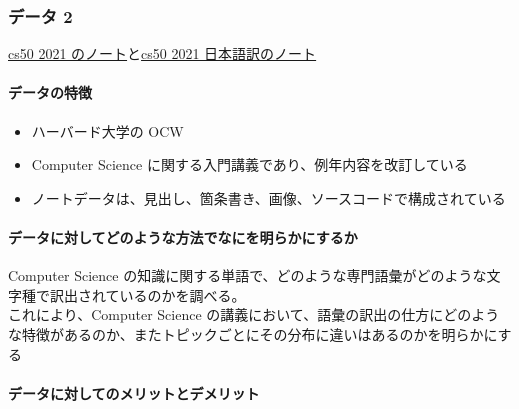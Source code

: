 \hypertarget{ux30c7ux30fcux30bf-2-1}{%
\subsubsection{データ 2}\label{ux30c7ux30fcux30bf-2-1}}

\href{https://cs50.harvard.edu/x/2021/notes/0/}{cs50 2021
のノート}と\href{https://cs50.jp/x/2021/week0/}{cs50 2021
日本語訳のノート}

\hypertarget{ux30c7ux30fcux30bfux306eux7279ux5fb4-4}{%
\paragraph{データの特徴}\label{ux30c7ux30fcux30bfux306eux7279ux5fb4-4}}

\begin{itemize}
\tightlist
\item
  ハーバード大学の OCW
\item
  Computer Science に関する入門講義であり、例年内容を改訂している
\item
  ノートデータは、見出し、箇条書き、画像、ソースコードで構成されている
\end{itemize}

\hypertarget{ux30c7ux30fcux30bfux306bux5bfeux3057ux3066ux3069ux306eux3088ux3046ux306aux65b9ux6cd5ux3067ux306aux306bux3092ux660eux3089ux304bux306bux3059ux308bux304b-4}{%
\paragraph{データに対してどのような方法でなにを明らかにするか}\label{ux30c7ux30fcux30bfux306bux5bfeux3057ux3066ux3069ux306eux3088ux3046ux306aux65b9ux6cd5ux3067ux306aux306bux3092ux660eux3089ux304bux306bux3059ux308bux304b-4}}

Computer Science
の知識に関する単語で、どのような専門語彙がどのような文字種で訳出されているのかを調べる。\\
これにより、Computer Science
の講義において、語彙の訳出の仕方にどのような特徴があるのか、またトピックごとにその分布に違いはあるのかを明らかにする

\hypertarget{ux30c7ux30fcux30bfux306bux5bfeux3057ux3066ux306eux30e1ux30eaux30c3ux30c8ux3068ux30c7ux30e1ux30eaux30c3ux30c8-4}{%
\paragraph{データに対してのメリットとデメリット}\label{ux30c7ux30fcux30bfux306bux5bfeux3057ux3066ux306eux30e1ux30eaux30c3ux30c8ux3068ux30c7ux30e1ux30eaux30c3ux30c8-4}}

